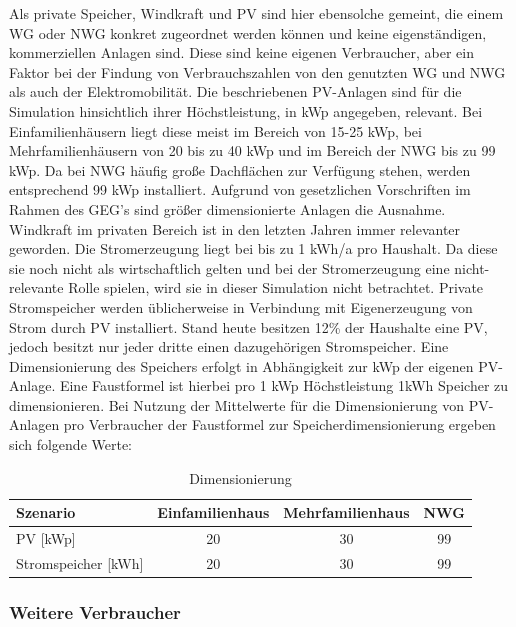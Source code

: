 Als private Speicher, Windkraft und PV sind hier ebensolche gemeint, die einem WG oder NWG konkret zugeordnet werden können und keine eigenständigen, kommerziellen Anlagen sind. 
Diese sind keine eigenen Verbraucher, aber ein Faktor bei der Findung von Verbrauchszahlen von den genutzten WG und NWG als auch der Elektromobilität.
Die beschriebenen PV-Anlagen sind für die Simulation hinsichtlich ihrer Höchstleistung, in kWp angegeben, relevant. 
Bei Einfamilienhäusern liegt diese meist im Bereich von 15-25 kWp, bei Mehrfamilienhäusern von 20 bis zu 40 kWp und im Bereich der NWG bis zu 99 kWp. 
Da bei NWG häufig große Dachflächen zur Verfügung stehen, werden entsprechend 99 kWp installiert. 
Aufgrund von gesetzlichen Vorschriften im Rahmen des GEG’s sind größer dimensionierte Anlagen die Ausnahme.
Windkraft im privaten Bereich ist in den letzten Jahren immer relevanter geworden. 
Die Stromerzeugung liegt bei bis zu 1 kWh/a pro Haushalt. 
Da diese sie noch nicht als wirtschaftlich gelten und bei der Stromerzeugung eine nicht-relevante Rolle spielen, wird sie in dieser Simulation nicht betrachtet.
Private Stromspeicher werden üblicherweise in Verbindung mit Eigenerzeugung von Strom durch PV installiert. 
Stand heute besitzen 12\% der Haushalte eine PV, jedoch besitzt nur jeder dritte einen dazugehörigen Stromspeicher. 
Eine Dimensionierung des Speichers erfolgt in Abhängigkeit zur kWp der eigenen PV-Anlage. 
Eine Faustformel ist hierbei pro 1 kWp Höchstleistung 1kWh Speicher zu dimensionieren. 
Bei Nutzung der Mittelwerte für die Dimensionierung von PV-Anlagen pro Verbraucher der Faustformel zur Speicherdimensionierung ergeben sich folgende Werte:

\begin{table}[htbp]
    \centering
    \caption{Dimensionierung}
    \label{tab:dimensionierung}
    \begin{tabular}{lccc}
        \toprule
        \textbf{Szenario} & \textbf{Einfamilienhaus} & \textbf{Mehrfamilienhaus} & \textbf{NWG} \\
        \midrule
        PV [kWp] & 20 & 30 & 99 \\
        Stromspeicher [kWh] & 20 & 30 & 99 \\
        \bottomrule
    \end{tabular}
\end{table}

\subsubsection{Weitere Verbraucher}

